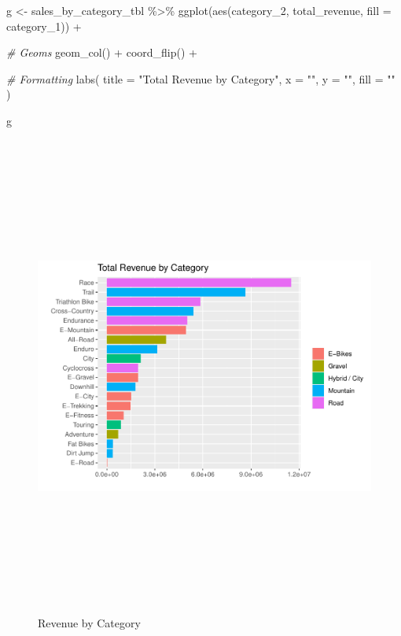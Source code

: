 \documentclass[
]{article}
\newenvironment{Shaded}{\begin{snugshade}}{\end{snugshade}}
\newcommand{\AttributeTok}[1]{\textcolor[rgb]{0.77,0.63,0.00}{#1}}
\newcommand{\CommentTok}[1]{\textcolor[rgb]{0.56,0.35,0.01}{\textit{#1}}}
\newcommand{\FunctionTok}[1]{\textcolor[rgb]{0.00,0.00,0.00}{#1}}
\newcommand{\NormalTok}[1]{#1}
\newcommand{\OtherTok}[1]{\textcolor[rgb]{0.56,0.35,0.01}{#1}}
\newcommand{\SpecialCharTok}[1]{\textcolor[rgb]{0.00,0.00,0.00}{#1}}
\newcommand{\StringTok}[1]{\textcolor[rgb]{0.31,0.60,0.02}{#1}}
\begin{document}
\begin{Shaded}
\begin{Highlighting}[]
\NormalTok{g }\OtherTok{\textless{}{-}}\NormalTok{ sales\_by\_category\_tbl }\SpecialCharTok{\%\textgreater{}\%}
  \FunctionTok{ggplot}\NormalTok{(}\FunctionTok{aes}\NormalTok{(category\_2, total\_revenue, }\AttributeTok{fill =}\NormalTok{ category\_1)) }\SpecialCharTok{+}
  
  \CommentTok{\# Geoms}
  \FunctionTok{geom\_col}\NormalTok{() }\SpecialCharTok{+}
  \FunctionTok{coord\_flip}\NormalTok{() }\SpecialCharTok{+}
  
  \CommentTok{\# Formatting}
  \FunctionTok{labs}\NormalTok{(}
    \AttributeTok{title =} \StringTok{"Total Revenue by Category"}\NormalTok{,}
    \AttributeTok{x =} \StringTok{""}\NormalTok{, }\AttributeTok{y =} \StringTok{""}\NormalTok{, }\AttributeTok{fill =} \StringTok{""}
\NormalTok{  )}

\NormalTok{g}
\end{Highlighting}
\end{Shaded}

\begin{figure}

{\centering \includegraphics[height=600px]{reporting_rmarkdown_files/figure-latex/unnamed-chunk-6-1} 

}

\caption{Revenue by Category}\label{fig:unnamed-chunk-6}
\end{figure}
\end{document}
